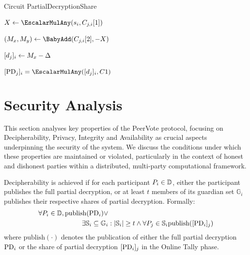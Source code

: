 \documentclass[runningheads]{llncs}
\begin{document}
\begin{algorithm}[H]
\caption{Circuit PartialDecryptionShare}
\label{alg:circuit_proof_pds}


\BlankLine

$X \leftarrow \EscalarMulAny(\PartySecretKey{i}, \EncryptedPartialDecryptionKeyShare{j}{i}[1])$\; %

$(M_x, M_y) \leftarrow \BabyAdd(\EncryptedPartialDecryptionKeyShare{j}{i}[2], - X)$\; %

$[d_{j}]_{i} \leftarrow M_x - \Delta$\;

\Assert $\SharePartialDecryptionFromTo{j}{i} = \EscalarMulAny(\PartialDecryptionKeyShare{j}{i}, \TotalA{})$
\end{algorithm}



\section{Security Analysis}

This section analyses key properties of the PeerVote protocol, focusing on Decipherability, Privacy, Integrity and Availability as crucial aspects underpinning the security of the system. We discuss the conditions under which these properties are maintained or violated, particularly in the context of honest and dishonest parties within a distributed, multi-party computational framework.

\newpage

\begin{definition}[Decipherability] \label{def:decipherability}
    Decipherability is achieved if for each participant $P_{i} \in \mathbb{D}$, either the participant publishes the full partial decryption, or at least $t$ members of its guardian set $\mathbb{G}_i$ publishes their respective shares of partial decryption. Formally: 
    \begin{align*}\forall P_{i} \in \mathbb{D},  \textrm{publish}(\mathrm{PD}_{i}) \lor & \\ \exists \mathbb{S}_i \subseteq  \mathbb{G}_i & : |\mathbb{S}_i| \geq t \land \forall P_{j} \in \mathbb{S}_i \textrm{publish}([\mathrm{PD}_{i}]_{j}) \end{align*}
    where \(\textrm{publish}(\cdot)\) denotes the publication of either the full partial decryption $\mathrm{PD}_{i}$ or the share of partial decryption $[\mathrm{PD}_{i}]_{j}$ in the Online Tally phase.
\end{definition}
\end{document}
